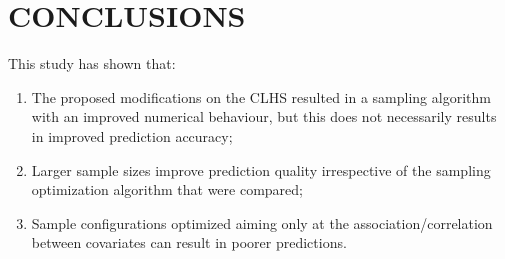 \section{CONCLUSIONS}

This study has shown that:

\begin{enumerate}[label = (\Roman*)]
\item The proposed modifications on the CLHS resulted in a sampling algorithm with an improved numerical 
behaviour, but this does not necessarily results in improved prediction accuracy;

\item Larger sample sizes improve prediction quality irrespective of the sampling optimization algorithm that
were compared;

\item Sample configurations optimized aiming only at the association/correlation between covariates can 
result in poorer predictions.
\end{enumerate}
